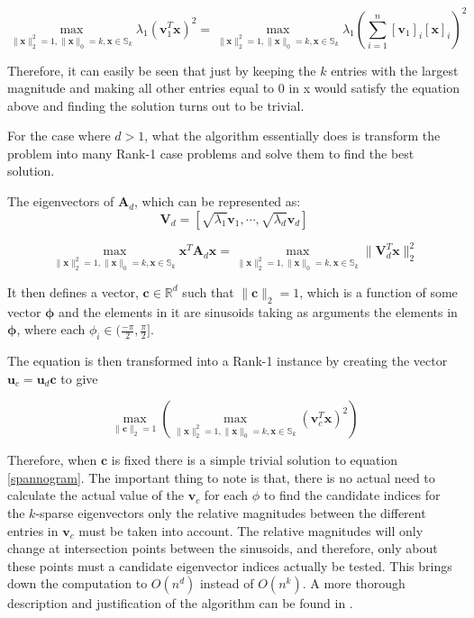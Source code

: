 \documentclass[graybox]{svmult}
\begin{document}
\begin{equation*}
\underset{\|\mathbf{x}\|_2^2 = 1, \|\mathbf{x}\|_0 = k, \mathbf{x} \in\mathbb{S}_k} \max\lambda_1 \left(\mathbf{v}_1^T \mathbf{x}\right)^2 
= \underset{\|\mathbf{x}\|_2^2 = 1, \|\mathbf{x}\|_0 = k, \mathbf{x} \in\mathbb{S}_k} \max \lambda_1\left( \sum_{i = 1}^n [\mathbf{v}_{1}]_i [\mathbf{x}]_i\right)^2
\end{equation*}

Therefore, it can easily be seen that just by keeping the $k$ entries with the largest magnitude and making all other entries equal to 0 in x would satisfy the equation above and finding the solution turns out to be trivial. 

For the case where $d > 1$, what the algorithm essentially does is transform the problem into many Rank-1 case problems and solve them to find the best solution.

The eigenvectors of $\mathbf{A}_d$, which can be represented as:
\begin{equation*}
\mathbf{V}_d = [\sqrt{\lambda_1}\mathbf{v}_1, \cdots, \sqrt{\lambda_d}\mathbf{v}_d]
\end{equation*}

\begin{equation*}
\underset{\|\mathbf{x}\|_2^2 = 1, \|\mathbf{x}\|_0 = k, \mathbf{x} \in\mathbb{S}_k} \max  \mathbf{x}^T\mathbf{A}_d\mathbf{x} 
= \underset{\|\mathbf{x}\|_2^2 = 1, \|\mathbf{x}\|_0 = k, \mathbf{x} \in\mathbb{S}_k}\max\|\mathbf{V}_d^T\mathbf{x}\|_2^2
\end{equation*}


It then defines a vector, $\mathbf{c} \in \mathbb{R}^d$ such that $\|\mathbf{c}\|_2=1$, which is a function of some vector $\mathbf{\phi}$ and the elements in it are sinusoids taking as arguments the elements in $\mathbf{\phi}$, where each $\phi_i \in (\frac{-\pi}{2}, \frac{\pi}{2}]$.

The equation is then transformed into a Rank-1 instance by creating the vector $\mathbf{u}_c = \mathbf{u}_d \mathbf{c}$ to give 

\begin{equation}
\max_{\|\mathbf{c}\|_2 =1} \left(\underset{\|\mathbf{x}\|_2^2 = 1, \|\mathbf{x}\|_0 = k, \mathbf{x} \in\mathbb{S}_k}\max\left(\mathbf{v}_c^T \mathbf{x}\right)^2 \right)
\label{spannogram}
\end{equation}

Therefore, when $\mathbf{c}$ is fixed there is a simple trivial solution to  equation \ref{spannogram}. The important thing to note is that, there is no actual need to calculate the actual value of the $\mathbf{v}_c$ for each $\phi$ to find the candidate indices for the $k$-sparse eigenvectors only the relative magnitudes between the different entries in  $\mathbf{v}_c$ must be taken into account. The relative magnitudes will only change at intersection points between the sinusoids, and therefore, only about these points must a candidate eigenvector indices actually be tested. This brings down the computation to $O \left(n^d\right)$ instead of $O \left(n^k\right)$. A more thorough description and justification of the algorithm can be found in \cite{dimakis}.
\end{document}
